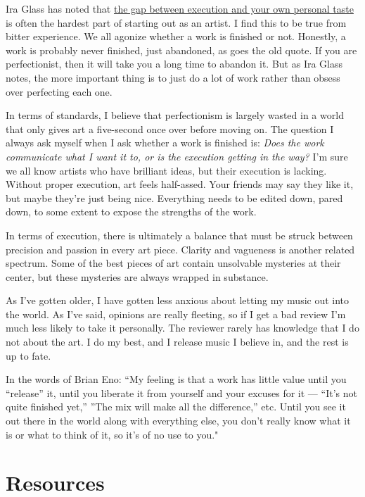 \documentclass[
]{book}
\begin{document}
Ira Glass has noted that \href{https://www.brainpickings.org/2014/01/29/ira-glass-success-daniel-sax/}{the gap between execution and your own personal taste} is often the hardest part of starting out as an artist. I find this to be true from bitter experience. We all agonize whether a work is finished or not. Honestly, a work is probably never finished, just abandoned, as goes the old quote. If you are perfectionist, then it will take you a long time to abandon it. But as Ira Glass notes, the more important thing is to just do a lot of work rather than obsess over perfecting each one.

In terms of standards, I believe that perfectionism is largely wasted in a world that only gives art a five-second once over before moving on. The question I always ask myself when I ask whether a work is finished is: \emph{Does the work communicate what I want it to, or is the execution getting in the way?} I'm sure we all know artists who have brilliant ideas, but their execution is lacking. Without proper execution, art feels half-assed. Your friends may say they like it, but maybe they're just being nice. Everything needs to be edited down, pared down, to some extent to expose the strengths of the work.

In terms of execution, there is ultimately a balance that must be struck between precision and passion in every art piece. Clarity and vagueness is another related spectrum. Some of the best pieces of art contain unsolvable mysteries at their center, but these mysteries are always wrapped in substance.

As I've gotten older, I have gotten less anxious about letting my music out into the world. As I've said, opinions are really fleeting, so if I get a bad review I'm much less likely to take it personally. The reviewer rarely has knowledge that I do not about the art. I do my best, and I release music I believe in, and the rest is up to fate.

In the words of Brian Eno: ``My feeling is that a work has little value until you ``release'' it, until you liberate it from yourself and your excuses for it --- ``It's not quite finished yet,'' ''The mix will make all the difference,'' etc. Until you see it out there in the world along with everything else, you don't really know what it is or what to think of it, so it's of no use to you."

\hypertarget{resources-7}{%
\section{Resources}\label{resources-7}}
\end{document}
